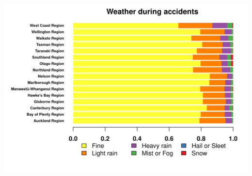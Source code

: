 \documentclass[xcolor=dvipsnames,xcolor=table, 14p]{beamer}
\begin{document}
\begin{frame}
    \centering
    \includegraphics[width=1\textwidth]{figures/regions3-1.png}
\end{frame}
\end{document}
